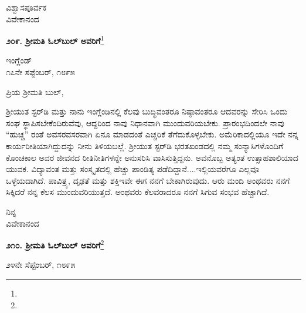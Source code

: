 \vspace{-0.3cm}

{\flushright
ವಿಶ್ವಾಸಪೂರ್ವಕ\\ವಿವೇಕಾನಂದ\par}

\vspace{-0.3cm}

\begin{center}
\textbf{೨೦೯. ಶ‍್ರೀಮತಿ ಓಲ್‌ಬುಲ್‌ ಅವರಿಗೆ}\footnote{}
\end{center}

\vspace{-0.4cm}

\begin{flushright}
ಇಂಗ್ಲೆಂಡ್\\೧೭ನೇ ಸಪ್ಟೆಂಬರ್, ೧೮೯೫
\end{flushright}

\vspace{-0.3cm}

\noindent
ಪ್ರಿಯ ಶ‍್ರೀಮತಿ ಬುಲ್,

ಶ‍್ರೀಯುತ ಸ್ಟರ್‌ಡಿ ಮತ್ತು ನಾನು ಇಂಗ್ಲೆಂಡಿನಲ್ಲಿ ಕೆಲವು ಬುದ್ಧಿವಂತರೂ ನಿಷ್ಠಾವಂತರೂ ಆದವರನ್ನು ಸೇರಿಸಿ ಒಂದು ಸಂಘ ಸ್ಥಾಪಿಸಬೇಕೆಂದಿರುವೆವು, ಆದ್ದರಿಂದ ನಾವು ನಿಧಾನವಾಗಿ ಮುಂದುವರಿಯಬೇಕು. ಪ್ರಾರಂಭದಿಂದಲೇ ನಾವು “ಹುಚ್ಚ” ರಂತೆ ಅವಸರವಸರವಾಗಿ ಏನೂ ಮಾಡದಂತೆ ಎಚ್ಚರಿಕೆ ತೆಗೆದುಕೊಳ್ಳಬೇಕು. ಅಮೆರಿಕಾದಲ್ಲಿಯೂ ಇದೇ ನನ್ನ ಕಾರ್ಯರೀತಿಯಾಗಿದ್ದುದನ್ನು ನೀನು ತಿಳಿಯಬಲ್ಲೆ. ಶ‍್ರೀಯುತ ಸ್ಟರ್‌ಡಿ ಭರತಖಂಡದಲ್ಲಿ ನಮ್ಮ ಸಂನ್ಯಾಸಿಗಳೊಂದಿಗೆ ಕೊಂಚಕಾಲ ಅವರ ಜೀವನದ ರೀತಿನೀತಿಗಳನ್ನೇ ಅನುಸರಿಸಿ ವಾಸಿಸುತ್ತಿದ್ದನು. ಅವನೊಬ್ಬ ಅತ್ಯಂತ ಉತ್ಸಾಹಶಾಲಿಯಾದ ಯುವಕ. ವಿದ್ಯಾವಂತ ಮತ್ತು ಸಂಸ್ಕೃತದಲ್ಲಿ ಹೆಚ್ಚು ಪಾಂಡಿತ್ಯ ಪಡೆದಿದ್ದಾನೆ....ಇಲ್ಲಿಯವರೆಗೂ ಎಲ್ಲವೂ ಒಳ್ಳೆಯದಾಗಿದೆ. ಪಾವಿತ್ರ್ಯ, ದೃಢತೆ ಮತ್ತು ಶಕ್ತಿ\enginline{-}ಇವೇ ಈಗ ನನಗೆ ಬೇಕಾಗಿರುವುದು. ಆರು ಮಂದಿ ಅಂಥವರು ನನಗೆ ಸಿಕ್ಕಿದರೆ ನನ್ನ ಕೆಲಸ ಮುಂದುವರಿಯುತ್ತದೆ. ಅಂಥವರು ಕೆಲವರಾದರೂ ನನಗೆ ಸಿಗುವ ಸಂಭವ ಹೆಚ್ಚಾಗಿದೆ.

\vspace{-0.4cm}

{\flushright
ನಿನ್ನ\\ವಿವೇಕಾನಂದ\par}
\vspace{-0.4cm}

\begin{center}
\textbf{೨೧೦. ಶ‍್ರೀಮತಿ ಓಲ್‌ಬುಲ್‌ ಅವರಿಗೆ}\footnote{}
\end{center}

\vspace{-0.7cm}

\begin{flushright}
೨೪ನೇ ಸೆಪ್ಟೆಂಬರ್, ೧೮೯೫
\end{flushright}
\vspace{-0.4cm}

